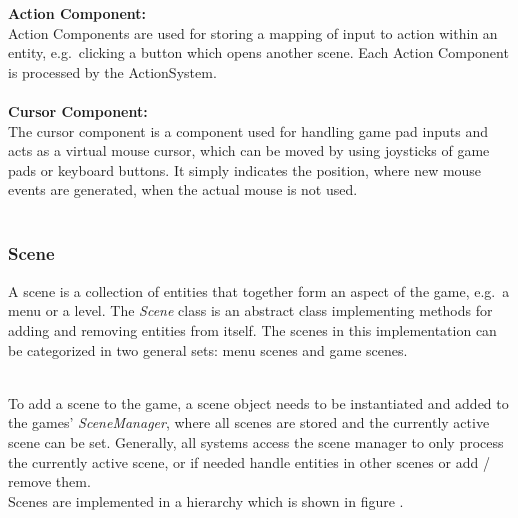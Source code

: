 \textbf{Action Component:} \\
Action Components are used for storing a mapping of input to action within an entity, e.g.\ clicking a button which opens another scene.
Each Action Component is processed by the ActionSystem. \\ \\

\textbf{Cursor Component:} \\
The cursor component is a component used for handling game pad inputs and acts as a virtual mouse cursor, which can be moved by using
joysticks of game pads or keyboard buttons.
It simply indicates the position, where new mouse events are generated, when the actual mouse is not used. \\ \\

\subsubsection{Scene}\label{subsubsec:scene}
A scene is a collection of entities that together form an aspect of the game, e.g.\ a menu or a level.
The \textit{Scene} class is an abstract class implementing methods for adding and removing entities from itself.
The scenes in this implementation can be categorized in two general sets: menu scenes and game scenes.

\\
To add a scene to the game, a scene object needs to be instantiated and added to the games' \textit{SceneManager}, where all
scenes are stored and the currently active scene can be set.
Generally, all systems access the scene manager to only process the currently active scene, or if needed handle entities in other scenes or add / remove them.
\\

Scenes are implemented in a hierarchy which is shown in figure .


